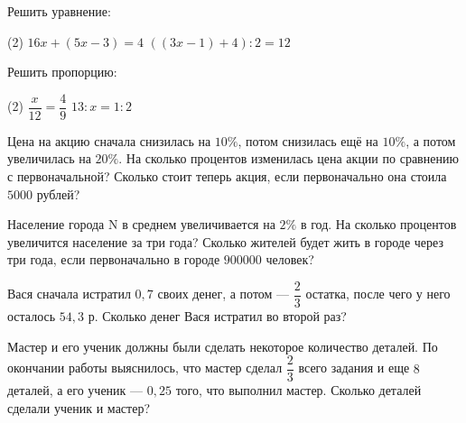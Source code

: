 \begin{class}[number=3]
	\begin{listofex}
		\item Решить уравнение:
		\begin{tasks}(2)
			\task \( 16x+(5x-3)=4 \)
			\task \( ((3x-1)+4):2=12\)
		\end{tasks}
		\item Решить пропорцию:
		\begin{tasks}(2)
			\task \( \dfrac{x}{12}=\dfrac{4}{9} \)
			\task \( 13:x=1:2\)
		\end{tasks}
		\item Цена на акцию сначала снизилась на \( 10 \% \), потом снизилась ещё на \(10 \% \), а потом увеличилась на \(20\%\). На сколько процентов изменилась цена акции по сравнению с первоначальной? Сколько стоит теперь акция, если первоначально она стоила \(5000\) рублей?
		\item Население города N в среднем увеличивается на \(2\%\) в год. На сколько процентов увеличится население за три года? Сколько жителей будет жить в городе через три года, если первоначально в городе \(900000\) человек?
		\item Вася сначала истратил \(0,7\) своих денег, а потом --- \(\dfrac{2}{3} \) остатка, после чего у него осталось \(54,3\) р. Сколько денег Вася истратил во второй раз?
		\item Мастер и его ученик должны были сделать некоторое количество деталей. По окончании работы выяснилось, что мастер сделал \(\dfrac{2}{3}\) всего задания и еще \(8\) деталей, а его ученик --- \(0,25\) того, что выполнил мастер. Сколько деталей сделали ученик и мастер?
	\end{listofex}
\end{class}

